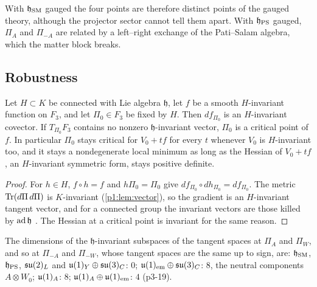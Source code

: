 With $\mathfrak h_{\rm SM}$ gauged the four points are therefore distinct points of the gauged theory, although the projector sector cannot tell them apart. With
$\mathfrak h_{\rm PS}$ gauged, $\Pi_A$ and $\Pi_{-A}$ are related by a left--right exchange of the Pati--Salam algebra, which the matter block breaks.

\subsection{Robustness}
\label{p3:sec:robust}

\begin{lemma}
\label{p3:lem:robust}
Let $H\subset K$ be connected with Lie algebra $\mathfrak h$, let $f$ be a smooth $H$-invariant function on $F_3$, and let $\Pi_0\in F_3$ be fixed by $H$. Then $df_{\Pi_0}$ is
an $H$-invariant covector. If $T_{\Pi_0}F_3$ contains no nonzero $\mathfrak h$-invariant vector, $\Pi_0$ is a critical point of $f$. In particular $\Pi_0$ stays critical
for $V_0+tf$ for every $t$ whenever $V_0$ is $H$-invariant too, and it stays a nondegenerate local minimum as long as the Hessian of $V_0+tf$, an $H$-invariant
symmetric form, stays positive definite.
\end{lemma}

\begin{proof}
For $h\in H$, $f\circ h=f$ and $h\Pi_0=\Pi_0$ give $df_{\Pi_0}\circ dh_{\Pi_0}=df_{\Pi_0}$. The metric $\operatorname{Tr}(d\Pi\,d\Pi)$ is $K$-invariant (\cref{p1:lem:vector}), so the gradient
is an $H$-invariant tangent vector, and for a connected group the invariant vectors are those killed by $\operatorname{ad}\mathfrak h$ \cite{Michel71,Palais79}. The Hessian at a critical
point is invariant for the same reason.
\end{proof}

\begin{proposition}
\label{p3:prop:invariants}
The dimensions of the $\mathfrak h$-invariant subspaces of the tangent spaces at $\Pi_A$ and $\Pi_W$, and so at $\Pi_{-A}$ and $\Pi_{-W}$, whose tangent spaces are the same
up to sign, are: $\mathfrak h_{\rm SM}$, $\mathfrak h_{\rm PS}$, $\mathfrak{su}(2)_L$ and $\mathfrak{u}(1)_Y\oplus\mathfrak{su}(3)_C$: $0$; $\mathfrak{u}(1)_{\rm em}\oplus\mathfrak{su}(3)_C$: $8$, the neutral components $A\otimes W_0$;
$\mathfrak{u}(1)_A$: $8$; $\mathfrak{u}(1)_A\oplus\mathfrak{u}(1)_{\rm em}$: $4$ (p3-19).
\end{proposition}

